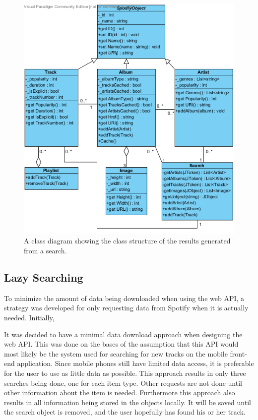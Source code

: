 \begin{figure}[hbtp]
\centering
\includegraphics[width=\textwidth]{Images/WebAPIUML.png}
\caption[Class structure of the results generated from a search.]{A class diagram showing the class structure of the results generated from a search.}
\label{fig:WebAPIUML}
\end{figure}

\subsection{Lazy Searching}

To minimize the amount of data being downloaded when using the web API, a strategy was developed for only requesting data from Spotify when it is actually needed. Initially, 

It was decided to have a minimal data download approach when designing the web API. This was done on the bases of the assumption that this API would most likely be the system used for searching for new tracks on the mobile front-end application. Since mobile phones still have limited data access, it is preferable for the user to use as little data as possible. This approach results in only three searches being done, one for each item type. Other requests are not done until other information about the item is needed. Furthermore this approach also results in all information being stored in the objects locally. It will be saved until the search object is removed, and the user hopefully has found his or her track.

